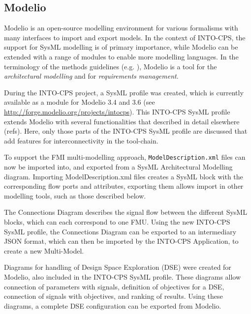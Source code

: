 \subsection{Modelio}
\label{sec:modelio}
Modelio is an open-source modelling environment for various formalisms with many interfaces to import and export models. In the context of INTO-CPS, the support for SysML modelling is of primary importance, while Modelio can be extended with a range of modules to enable more modelling languages. In the terminology of the methods guidelines (e.g. \cite{INTOCPSD3.3a}), Modelio is a tool for the \textit{architectural modelling} and for \textit{requirements management}.

During the INTO-CPS project, a SysML profile was created, which is currently available as a module for Modelio 3.4 and 3.6 (see \url{http://forge.modelio.org/projects/intocps}). This INTO-CPS SysML profile extends Modelio with several functionalities that described in detail elsewhere (refs). Here, only those parts of the INTO-CPS SysML profile are discussed that add features for interconnectivity in the tool-chain.

To support the FMI multi-modelling approach, \texttt{ModelDescription.xml} files can now be imported into, and exported from a SysML Architectural Modelling diagram. Importing ModelDescription.xml files creates a SysML block with the corresponding flow ports and attributes, exporting them allows import in other modelling tools, such as those described below.

The Connections Diagram describes the signal flow between the different SysML blocks, which can each correspond to one FMU. Using the new INTO-CPS SysML profile, the Connections Diagram can be exported to an intermediary JSON format, which can then be imported by the INTO-CPS Application, to create a new Multi-Model.


Diagrams for handling of Design Space Exploration (DSE) were created for Modelio, also included in the INTO-CPS SysML profile. These diagrams allow connection of parameters with signals, definition of objectives for a DSE, connection of signals with objectives, and ranking of results. Using these diagrams, a complete DSE configuration can be exported from Modelio.

